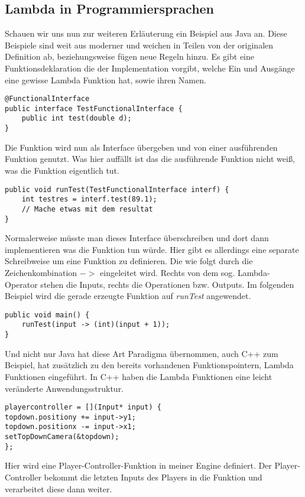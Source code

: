 \subsection{Lambda in Programmiersprachen}
Schauen wir uns nun zur weiteren Erläuterung ein Beispiel aus Java an. Diese Beispiele sind weit aus moderner und weichen in Teilen von der originalen Definition ab, beziehungsweise fügen neue Regeln hinzu. Es gibt eine Funktionsdeklaration die der Implementation vorgibt, welche Ein und Ausgänge eine gewisse Lambda Funktion hat, sowie ihren Namen.
\begin{verbatim}
@FunctionalInterface
public interface TestFunctionalInterface {
	public int test(double d);
}
\end{verbatim}
Die Funktion wird nun als Interface übergeben und von einer ausführenden Funktion genutzt. Was hier auffällt ist das die ausführende Funktion nicht weiß, was die Funktion eigentlich tut.
\begin{verbatim}
public void runTest(TestFunctionalInterface interf) {
	int testres = interf.test(89.1);
	// Mache etwas mit dem resultat
}
\end{verbatim}
Normalerweise müsste man dieses Interface überschreiben und dort dann implementieren was die Funktion tun würde. Hier gibt es allerdings eine separate Schreibweise um eine Funktion zu definieren. Die wie folgt durch die Zeichenkombination $->$ eingeleitet wird. Rechts von dem sog. Lambda-Operator stehen die Inputs, rechts die Operationen bzw. Outputs. Im folgenden Beispiel wird die gerade erzeugte Funktion auf \emph{runTest} angewendet.
\begin{verbatim}
public void main() {
	runTest(input -> (int)(input + 1));
}
\end{verbatim}
Und nicht nur Java hat diese Art Paradigma übernommen, auch C++ zum Beispiel, hat zusätzlich zu den bereits vorhandenen Funktionspointern, Lambda Funktionen eingeführt.
In C++ haben die Lambda Funktionen eine leicht veränderte Anwendungsstruktur.
\begin{verbatim}
playercontroller = [](Input* input) { 
topdown.positiony += input->y1; 
topdown.positionx -= input->x1;
setTopDownCamera(&topdown); 
};
\end{verbatim}
Hier wird eine Player-Controller-Funktion in meiner Engine definiert. Der Player-Controller bekommt die letzten Inputs des Players in die Funktion und verarbeitet diese dann weiter.